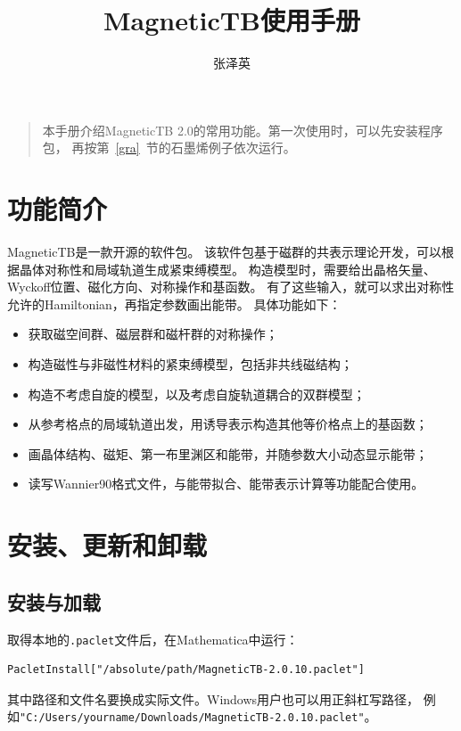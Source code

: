 \documentclass[titlepage,a4paper,12pt,AutoFakeBold]{article}
\begin{document}
\title{\textsf{MagneticTB}使用手册}
\author{张泽英}

\maketitle


\tableofcontents

\begin{quote}
\small
本手册介绍\textsf{MagneticTB} 2.0的常用功能。第一次使用时，可以先安装程序包，
再按第~\ref{gra}~节的石墨烯例子依次运行。
\end{quote}
\newpage

\section{功能简介}
\textsf{MagneticTB}是一款开源的软件包。
该软件包基于磁群的共表示理论开发，可以根据晶体对称性和局域轨道生成紧束缚模型。
构造模型时，需要给出晶格矢量、Wyckoff位置、磁化方向、对称操作和基函数。
有了这些输入，就可以求出对称性允许的Hamiltonian，再指定参数画出能带。
具体功能如下：
\begin{itemize}
\item 获取磁空间群、磁层群和磁杆群的对称操作；
\item 构造磁性与非磁性材料的紧束缚模型，包括非共线磁结构；
\item 构造不考虑自旋的模型，以及考虑自旋轨道耦合的双群模型；
\item 从参考格点的局域轨道出发，用诱导表示构造其他等价格点上的基函数；
\item 画晶体结构、磁矩、第一布里渊区和能带，并随参数大小动态显示能带；
\item 读写Wannier90格式文件，与能带拟合、能带表示计算等功能配合使用。
\end{itemize}

\section{安装、更新和卸载}
\subsection{安装与加载}
取得本地的\lstinline|.paclet|文件后，在Mathematica中运行：
\begin{lstlisting}[numbers=none]
PacletInstall["/absolute/path/MagneticTB-2.0.10.paclet"]
\end{lstlisting}
其中路径和文件名要换成实际文件。Windows用户也可以用正斜杠写路径，
例如\lstinline|"C:/Users/yourname/Downloads/MagneticTB-2.0.10.paclet"|。
\end{document}

